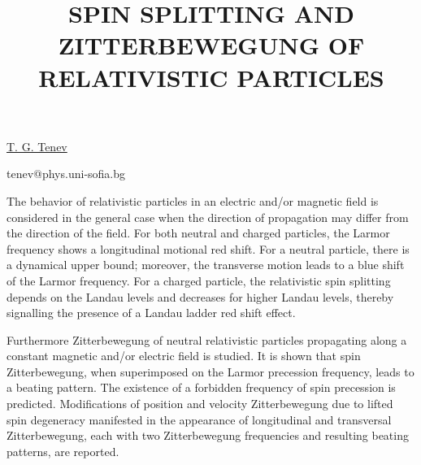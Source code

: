 \title{SPIN SPLITTING AND ZITTERBEWEGUNG OF RELATIVISTIC PARTICLES}

\underline{T. G. Tenev}

{\normalsize{
\vspace{-4mm}\unisofia

\email tenev@phys.uni-sofia.bg}}

The behavior of relativistic particles in an electric and/or magnetic field is considered in the
general case when the direction of propagation may differ from the direction of the field. For both
neutral and charged particles, the Larmor frequency shows a longitudinal motional red shift. For a
neutral particle, there is a dynamical upper bound; moreover, the transverse motion leads to a blue
shift of the Larmor frequency. For a charged particle, the relativistic spin splitting depends on
the Landau levels and decreases for higher Landau levels, thereby signalling the presence of a
Landau ladder red shift effect.

Furthermore Zitterbewegung of neutral relativistic particles propagating along a constant magnetic
and/or electric field is studied. It is shown that spin Zitterbewegung, when superimposed on the
Larmor precession frequency, leads to a beating pattern. The existence of a forbidden frequency of
spin precession is predicted. Modifications of position and velocity Zitterbewegung due to lifted
spin degeneracy manifested in the appearance of longitudinal and transversal Zitterbewegung, each
with two Zitterbewegung frequencies and resulting beating patterns, are reported.

\vspace{\baselineskip}
